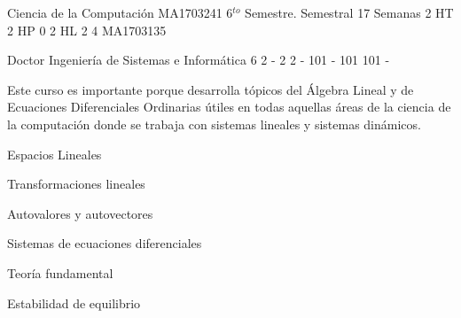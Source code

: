 \documentclass[a4paper,8pt]{article}
\begin{document}
\setNombreProfesor{}
\setGradoProfesorAbreviado{}
\sylabusHeader

\academicaTable
{Ciencia de la Computación} %
{MA1703241} %
{6$^{to}$ Semestre.} %
{Semestral} %
{17 Semanas} %
{2 HT} %
{2 HP} %
{0} %
{2 HL}  %
{2} %
{4} %
{MA1703135} %

\administrativaTable
{Doctor} %
{Ingeniería de Sistemas e Informática} %
{6} %
{2} %
{-} %
{2} %
{2} %
{-} %
{101} %
{-} %
{101} %
{101} %
{-} %


\begin{fundamentacion}
Este curso es importante porque desarrolla tópicos del Álgebra Lineal y de Ecuaciones Diferenciales Ordinarias útiles en todas aquellas áreas de la ciencia de la computación donde se trabaja con sistemas lineales y sistemas dinámicos.

\end{fundamentacion}

\begin{sumilla}
\item Espacios Lineales
\item Transformaciones lineales
\item Autovalores y autovectores
\item Sistemas de ecuaciones diferenciales
\item Teoría fundamental
\item Estabilidad de equilibrio

\end{sumilla}

\begin{competenciasAsignatura}
\item {}
\item {}
\item {}

\end{competenciasAsignatura}
\end{document}
